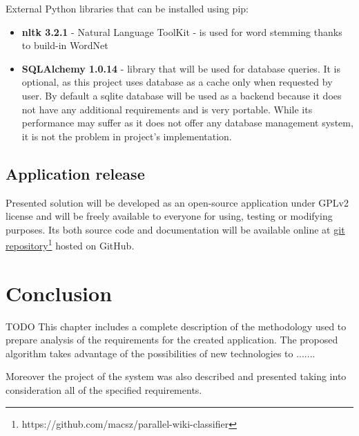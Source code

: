 External Python libraries that can be installed using pip:
\begin{itemize}
	\item \textbf{nltk 3.2.1} - Natural Language ToolKit - is used for word stemming thanks to build-in WordNet
	\item \textbf{SQLAlchemy 1.0.14} - library that will be used for database queries. It is optional, as this project uses database as a cache only when requested by user. By default a sqlite database will be used as a backend because it does not have any additional requirements and is very portable. While its performance may suffer as it does not offer any database management system, it is not the problem in project's implementation.
\end{itemize}


\subsection{Application release}
Presented solution will be developed as an open-source application under GPLv2 license and will be freely available to everyone for using, testing or modifying purposes. Its both source code and documentation will be available online at \href{https://github.com/macsz/parallel-wiki-classifier}{git repository\footnote{https://github.com/macsz/parallel-wiki-classifier} hosted on GitHub}.


\section{Conclusion}
TODO
This chapter includes a complete description of the methodology used to prepare analysis of the requirements for the created application. The proposed algorithm takes advantage of the possibilities of new technologies to .......

Moreover the project of the system was also described and presented taking into consideration all of the specified requirements.
